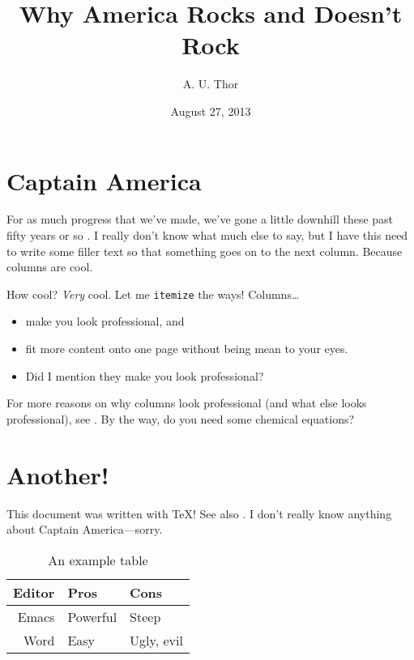 \documentclass{psypaper}
\title{Why America Rocks and Doesn't Rock}
\author{A. U. Thor}
\affil{St. Mary's College of Maryland}
\date{August 27, 2013}
\begin{document}
\maketitle

\section{Captain America}
For as much progress that we've made,
  we've gone a little downhill
  these past fifty years or so \autocite{rogers:elements}.
I really don't know what much else to say,
  but I have this need to write some filler text
  so that something goes on to the next column.
Because columns are cool.

How cool?
\emph{Very} cool.
Let me \texttt{itemize} the ways!
Columns\dots
\begin{itemize}
\item make you look professional, and
\item fit more content onto one page without being mean to your eyes.
\item Did I mention they make you look professional?
\end{itemize}

For more reasons on why columns look professional
  (and what else looks professional),
  see \cite{compandtype}.
By the way, do you need some chemical equations?


\section{Another!}
This document was written with \TeX! See also \cite{texbook}.
I don't really know anything about Captain America---sorry.

\begin{table}
  \centering
  \begin{tabular}{rll}
    \toprule
    Editor & Pros & Cons \\
    \midrule
    Emacs & Powerful & Steep \\
    Word  & Easy & Ugly, evil \\
    \bottomrule
  \end{tabular}
  \caption{An example table}
  \label{tab:ex}
\end{table}

\printbibliography
\end{document}
